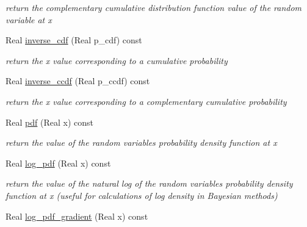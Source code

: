 \begin{DoxyCompactItemize}
\begin{DoxyCompactList}\small\item\em return the complementary cumulative distribution function value of the random variable at x \end{DoxyCompactList}\item 
Real \hyperlink{classPecos_1_1BoundedLognormalRandomVariable_a918a1aac05ca349ea5313eebcba46c3e}{inverse\+\_\+cdf} (Real p\+\_\+cdf) const \label{classPecos_1_1BoundedLognormalRandomVariable_a918a1aac05ca349ea5313eebcba46c3e}

\begin{DoxyCompactList}\small\item\em return the x value corresponding to a cumulative probability \end{DoxyCompactList}\item 
Real \hyperlink{classPecos_1_1BoundedLognormalRandomVariable_afda003a1f59ff6930902cd5c8601f49b}{inverse\+\_\+ccdf} (Real p\+\_\+ccdf) const \label{classPecos_1_1BoundedLognormalRandomVariable_afda003a1f59ff6930902cd5c8601f49b}

\begin{DoxyCompactList}\small\item\em return the x value corresponding to a complementary cumulative probability \end{DoxyCompactList}\item 
Real \hyperlink{classPecos_1_1BoundedLognormalRandomVariable_a8ec69265f428e17c1707133cb137a819}{pdf} (Real x) const \label{classPecos_1_1BoundedLognormalRandomVariable_a8ec69265f428e17c1707133cb137a819}

\begin{DoxyCompactList}\small\item\em return the value of the random variable\textquotesingle{}s probability density function at x \end{DoxyCompactList}\item 
Real \hyperlink{classPecos_1_1BoundedLognormalRandomVariable_a6e2b6b6f13eedb2eb1ef3bc455a06392}{log\+\_\+pdf} (Real x) const \label{classPecos_1_1BoundedLognormalRandomVariable_a6e2b6b6f13eedb2eb1ef3bc455a06392}

\begin{DoxyCompactList}\small\item\em return the value of the natural log of the random variable\textquotesingle{}s probability density function at x (useful for calculations of log density in Bayesian methods) \end{DoxyCompactList}\item 
Real \hyperlink{classPecos_1_1BoundedLognormalRandomVariable_a5ccc16c04690f0c501f44c1ffae2bbd1}{log\+\_\+pdf\+\_\+gradient} (Real x) const \label{classPecos_1_1BoundedLognormalRandomVariable_a5ccc16c04690f0c501f44c1ffae2bbd1}


\end{DoxyCompactItemize}
